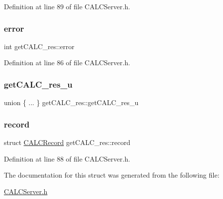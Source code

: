 Definition at line 89 of file C\+A\+L\+C\+Server.\+h.

\mbox{\label{structget_c_a_l_c__res_a7b710098a54c5364b16c8ae938c3d259}} 
\subsubsection{\texorpdfstring{error}{error}}
{\footnotesize\ttfamily int get\+C\+A\+L\+C\+\_\+res\+::error}



Definition at line 86 of file C\+A\+L\+C\+Server.\+h.

\mbox{\label{structget_c_a_l_c__res_a80f6113d079b86a7a8053508da4de62d}} 
\subsubsection{\texorpdfstring{get\+C\+A\+L\+C\+\_\+res\+\_\+u}{getCALC\_res\_u}}
{\footnotesize\ttfamily union \{ ... \}   get\+C\+A\+L\+C\+\_\+res\+::get\+C\+A\+L\+C\+\_\+res\+\_\+u}

\mbox{\label{structget_c_a_l_c__res_ab3fca75ff56c38ead38c929200c05532}} 
\subsubsection{\texorpdfstring{record}{record}}
{\footnotesize\ttfamily struct \hyperlink{struct_c_a_l_c_record}{C\+A\+L\+C\+Record} get\+C\+A\+L\+C\+\_\+res\+::record}



Definition at line 88 of file C\+A\+L\+C\+Server.\+h.



The documentation for this struct was generated from the following file\+:\begin{DoxyCompactItemize}
\item 
\hyperlink{_c_a_l_c_server_8h}{C\+A\+L\+C\+Server.\+h}\end{DoxyCompactItemize}
